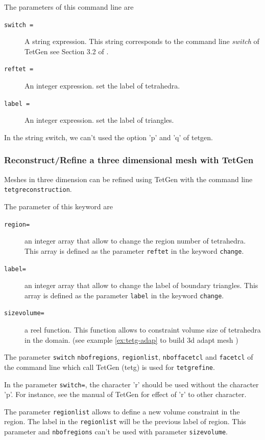 \documentclass[a4paper,twoside,12pt]{book}
\begin{document}
The parameters of this command line are
\begin{description}
\item [\texttt{switch  =}] A string expression. This string corresponds to the command line {\it{switch}} of TetGen see Section 3.2 of \cite{tetgen}.
\item [\texttt{reftet  =}] An integer expression. set the label of tetrahedra.
\item [\texttt{label =}] An integer expression. set the label of triangles.
\end{description}

In the string switch, we can't used the option 'p' and 'q' of tetgen.
\subsubsection{Reconstruct/Refine a three dimensional mesh with TetGen}
Meshes in three dimension can be refined using TetGen with the command line \texttt{tetgreconstruction}.

The parameter of this keyword are
\begin{description}
\item [\texttt{region=}] an integer array that allow to change the region number  of tetrahedra.
This array is defined as the parameter \texttt{reftet} in the keyword \texttt{change}.
\item [\texttt{label=}] an integer array that allow to change the label of boundary triangles.
This array is defined as the parameter \texttt{label} in the keyword \texttt{change}.
\item [\texttt{sizevolume=}] a reel function. This function allows to constraint volume size of tetrahedra in the domain. (see example \ref{ex:tetg-adap} to build 3d adapt mesh
)
\end{description}

The parameter \texttt{switch} \texttt{nbofregions}, \texttt{regionlist},
\texttt{nboffacetcl} and \texttt{facetcl} of the command line which call TetGen (tetg)
is used for \texttt{tetgrefine}.

In the parameter \texttt{switch=}, the character 'r' should be used without the character 'p'.
For instance, see the manual of TetGen \cite{tetgen} for effect of 'r' to other character.

The parameter \texttt{regionlist} allows to define a new volume constraint in the region.
The label in the \texttt{regionlist} will be the previous label of region.
This parameter and \texttt{nbofregions} can't be used with parameter \texttt{sizevolume}.
\end{document}
